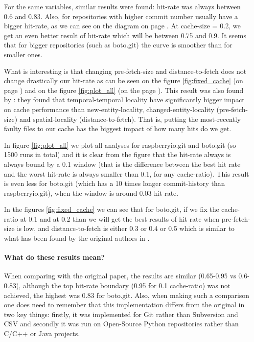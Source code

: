 \documentclass[12pt,twoside,notitlepage]{report}
\begin{document}
For the same variables, similar results were found: hit-rate was always between 0.6 and 0.83. Also, for repositories with higher commit number usually have a bigger hit-rate, as we can see on the diagram on page \pageref{fig:v5_repos}. At cache-size = 0.2, we get an even better result of hit-rate which will be between 0.75 and 0.9. It seems that for bigger repositories (such as boto.git) the curve is smoother than for smaller ones.

What is interesting is that changing pre-fetch-size and distance-to-fetch does not change drastically our hit-rate as can be seen on the figure \ref{fig:fixed_cache} (on page \pageref{fig:fixed_cache}) and on the figure \ref{fig:plot_all} (on the page \pageref{fig:plot_all}). This result was also found by \cite{Bugcache}: they found that temporal-temporal locality have significantly bigger impact on cache performance than new-entity-locality, changed-entity-locality (pre-fetch-size) and spatial-locality (distance-to-fetch). That is, putting the most-recently faulty files to our cache has the biggest impact of how many hits do we get.

In figure \ref{fig:plot_all} we plot all analyses for raspberryio.git and boto.git (so 1500 runs in total) and it is clear from the figure that the hit-rate always is always bound by a 0.1 window (that is the difference between the best hit rate and the worst hit-rate is always smaller than 0.1, for any cache-ratio). This result is even less for boto.git (which has a 10 times longer commit-history than raspberryio.git), when the window is around 0.03 hit-rate.

In the figures \ref{fig:fixed_cache} we can see that for boto.git, if we fix the cache-ratio at 0.1 and at 0.2 than we will get the best results of hit rate when pre-fetch-size is low, and distance-to-fetch is either 0.3 or 0.4 or 0.5 which is similar to what has been found by the original authors in \cite{FixCache}.
\paragraph{What do these results mean?} When comparing with the original paper, the results are similar (0.65-0.95 vs 0.6-0.83), although the top hit-rate boundary (0.95 for 0.1 cache-ratio) was not achieved, the highest was 0.83 for boto.git. Also, when making such a comparison one does need to remember that this implementation differs from the original in two key things: firstly, it was implemented for Git rather than Subversion and CSV and secondly it was run on Open-Source Python repositories rather than C/C++ or Java projects. 
\end{document}
